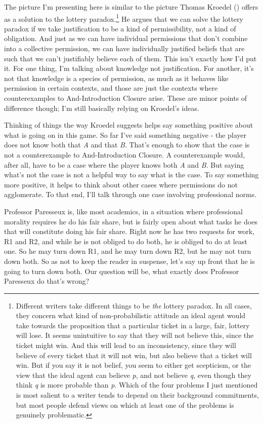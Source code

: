 \documentclass[
  10pt,
  letterpaper,
  twoside]{scrbook}
\begin{document}
The picture I'm presenting here is similar to the picture Thomas Kroedel
() offers as a solution to the lottery
paradox.\footnote{Different writers take different things to be
  \emph{the} lottery paradox. In all cases, they concern what kind of
  non-probabilistic attitude an ideal agent would take towards the
  proposition that a particular ticket in a large, fair, lottery will
  lose. It seems unintuitive to say that they will not believe this,
  since the ticket might win. And this will lead to an inconsistency,
  since they will believe of every ticket that it will not win, but also
  believe that a ticket will win. But if you say it is not belief, you
  seem to either get scepticism, or the view that the ideal agent can
  believe \emph{p}, and not believe \emph{q}, even though they think
  \emph{q} is more probable than \emph{p}. Which of the four problems I
  just mentioned is most salient to a writer tends to depend on their
  background commitments, but most people defend views on which at least
  one of the problems is genuinely problematic.} He argues that we can
solve the lottery paradox if we take justification to be a kind of
permissibility, not a kind of obligation. And just as we can have
individual permissions that don't combine into a collective permission,
we can have individually justified beliefs that are such that we can't
justifiably believe each of them. This isn't exactly how I'd put it. For
one thing, I'm talking about knowledge not justification. For another,
it's not that knowledge is a species of permission, as much as it
behaves like permission in certain contexts, and those are just the
contexts where counterexamples to And-Introduction Closure arise. These
are minor points of difference though; I'm still basically relying on
Kroedel's ideas.

Thinking of things the way Kroedel suggests helps say something positive
about what is going on in this game. So far I've said something negative
- the player does not know both that \emph{A} and that \emph{B}. That's
enough to show that the case is not a counterexample to And-Introduction
Closure. A counterexample would, after all, have to be a case where the
player knows both \emph{A} and \emph{B}. But saying what's not the case
is not a helpful way to say what is the case. To say something more
positive, it helps to think about other cases where permissions do not
agglomerate. To that end, I'll talk through one case involving
professional norms.

Professor Paresseux is, like most academics, in a situation where
professional morality requires he do his fair share, but is fairly open
about what tasks he does that will constitute doing his fair share.
Right now he has two requests for work, R1 and R2, and while he is not
obliged to do both, he is obliged to do at least one. So he may turn
down R1, and he may turn down R2, but he may not turn down both. So as
not to keep the reader in suspense, let's say up front that he is going
to turn down both. Our question will be, what exactly does Professor
Paresseux do that's wrong?
\end{document}
